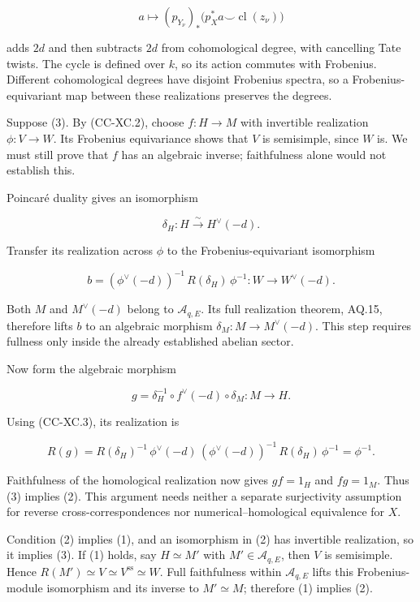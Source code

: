 \[
 a\longmapsto(p_{Y_\nu})_*\bigl(p_X^*a\smile\operatorname{cl}(z_\nu)\bigr)
\]

adds \(2d\) and then subtracts \(2d\) from cohomological degree, with
cancelling Tate twists. The cycle is defined over \(k\), so its action
commutes with Frobenius. Different cohomological degrees have disjoint
Frobenius spectra, so a Frobenius-equivariant map between these
realizations preserves the degrees.

Suppose (3). By (CC-XC.2), choose \(f:H\to M\) with invertible
realization \(\phi:V\to W\). Its Frobenius equivariance shows that \(V\)
is semisimple, since \(W\) is. We must still prove that \(f\) has an
algebraic inverse; faithfulness alone would not establish this.

Poincaré duality gives an isomorphism

\[
 \delta_H:H\xrightarrow{\sim}H^\vee(-d).
\]

Transfer its realization across \(\phi\) to the Frobenius-equivariant
isomorphism

\[
 b=(\phi^\vee(-d))^{-1}\,R(\delta_H)\,\phi^{-1}:
       W\longrightarrow W^\vee(-d).               \tag{CC-XC.3}
\]

Both \(M\) and \(M^\vee(-d)\) belong to \(\mathcal A_{q,E}\). Its full
realization theorem, AQ.15, therefore lifts \(b\) to an algebraic
morphism \(\delta_M:M\to M^\vee(-d)\). This step requires fullness only
inside the already established abelian sector.

Now form the algebraic morphism

\[
 g=\delta_H^{-1}\circ f^\vee(-d)\circ\delta_M:
          M\longrightarrow H.                    \tag{CC-XC.4}
\]

Using (CC-XC.3), its realization is

\[
 R(g)=R(\delta_H)^{-1}\,
       \phi^\vee(-d)\,
       (\phi^\vee(-d))^{-1}\,
       R(\delta_H)\,\phi^{-1}
       =\phi^{-1}.
\]

Faithfulness of the homological realization now gives \(gf=1_H\) and
\(fg=1_M\). Thus (3) implies (2). This argument needs neither a separate
surjectivity assumption for reverse cross-correspondences nor
numerical--homological equivalence for \(X\).

Condition (2) implies (1), and an isomorphism in (2) has invertible
realization, so it implies (3). If (1) holds, say \(H\simeq M'\) with
\(M'\in\mathcal A_{q,E}\), then \(V\) is semisimple. Hence
\(R(M')\simeq V\simeq V^{\mathrm{ss}}\simeq W\). Full faithfulness
within \(\mathcal A_{q,E}\) lifts this Frobenius-module isomorphism and
its inverse to \(M'\simeq M\); therefore (1) implies (2).

